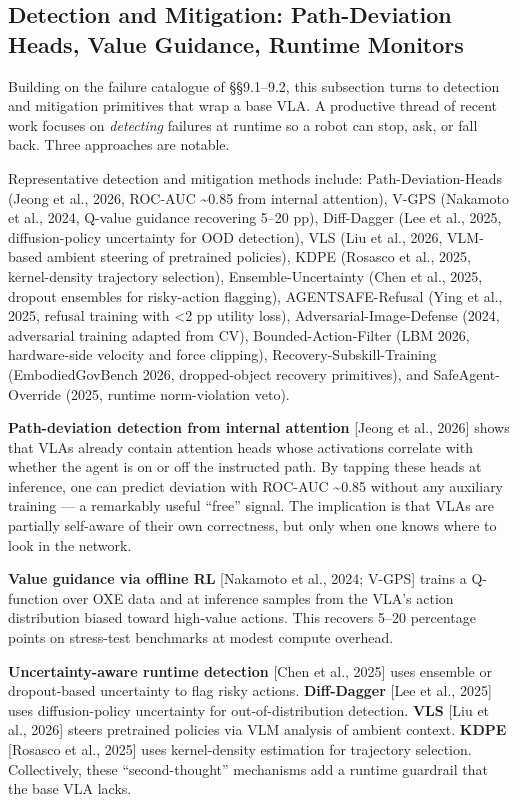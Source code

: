 \subsection{Detection and Mitigation: Path-Deviation Heads, Value Guidance, Runtime Monitors}\label{detection-and-mitigation-path-deviation-heads-value-guidance-runtime-monitors}

Building on the failure catalogue of §§9.1--9.2, this subsection turns to detection and mitigation primitives that wrap a base VLA. A productive thread of recent work focuses on \emph{detecting} failures at runtime so a robot can stop, ask, or fall back. Three approaches are notable.

Representative detection and mitigation methods include: Path-Deviation-Heads (Jeong et al., 2026, ROC-AUC \textasciitilde0.85 from internal attention), V-GPS (Nakamoto et al., 2024, Q-value guidance recovering 5--20 pp), Diff-Dagger (Lee et al., 2025, diffusion-policy uncertainty for OOD detection), VLS (Liu et al., 2026, VLM-based ambient steering of pretrained policies), KDPE (Rosasco et al., 2025, kernel-density trajectory selection), Ensemble-Uncertainty (Chen et al., 2025, dropout ensembles for risky-action flagging), AGENTSAFE-Refusal (Ying et al., 2025, refusal training with \textless2 pp utility loss), Adversarial-Image-Defense (2024, adversarial training adapted from CV), Bounded-Action-Filter (LBM 2026, hardware-side velocity and force clipping), Recovery-Subskill-Training (EmbodiedGovBench 2026, dropped-object recovery primitives), and SafeAgent-Override (2025, runtime norm-violation veto).

\textbf{Path-deviation detection from internal attention} {[}Jeong et al., 2026{]} shows that VLAs already contain attention heads whose activations correlate with whether the agent is on or off the instructed path. By tapping these heads at inference, one can predict deviation with ROC-AUC \textasciitilde0.85 without any auxiliary training --- a remarkably useful ``free'' signal. The implication is that VLAs are partially self-aware of their own correctness, but only when one knows where to look in the network.

\textbf{Value guidance via offline RL} {[}Nakamoto et al., 2024; V-GPS{]} trains a Q-function over OXE data and at inference samples from the VLA's action distribution biased toward high-value actions. This recovers 5--20 percentage points on stress-test benchmarks at modest compute overhead.

\textbf{Uncertainty-aware runtime detection} {[}Chen et al., 2025{]} uses ensemble or dropout-based uncertainty to flag risky actions. \textbf{Diff-Dagger} {[}Lee et al., 2025{]} uses diffusion-policy uncertainty for out-of-distribution detection. \textbf{VLS} {[}Liu et al., 2026{]} steers pretrained policies via VLM analysis of ambient context. \textbf{KDPE} {[}Rosasco et al., 2025{]} uses kernel-density estimation for trajectory selection. Collectively, these ``second-thought'' mechanisms add a runtime guardrail that the base VLA lacks.

